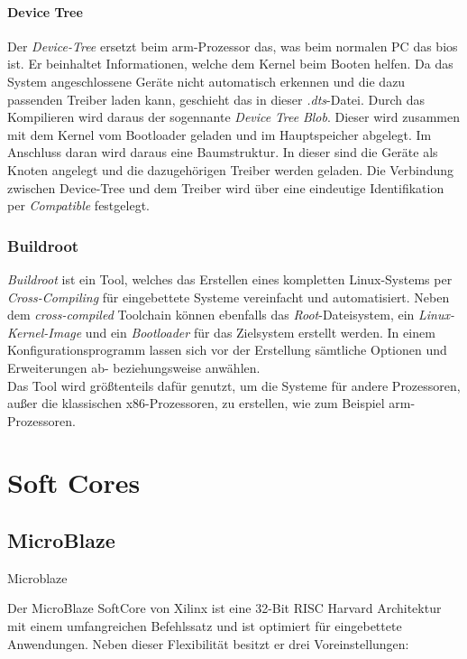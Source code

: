 \subsubsection{Device Tree}\label{kap:devicetree}


Der \emph{Device-Tree} ersetzt beim \ac{arm}-Prozessor das, was beim normalen PC das \ac{bios} ist. Er beinhaltet
Informationen, welche dem Kernel beim Booten helfen. Da das System angeschlossene Geräte nicht automatisch erkennen
und die dazu passenden Treiber laden kann, geschieht das in dieser \emph{.dts}-Datei. Durch das Kompilieren wird daraus
der sogennante \emph{Device} \emph{Tree} \emph{Blob}. Dieser wird zusammen mit dem Kernel vom Bootloader geladen und im
Hauptspeicher abgelegt. Im Anschluss daran wird daraus eine Baumstruktur. In dieser sind die Geräte als Knoten angelegt
und die dazugehörigen Treiber werden geladen. Die Verbindung zwischen Device-Tree und dem Treiber wird über eine
eindeutige Identifikation per \emph{Compatible} festgelegt.


\subsection{Buildroot}\label{kap:buildroot}

\emph{Buildroot} ist ein Tool, welches das Erstellen eines kompletten Linux-Systems per
\emph{Cross-Compiling} für eingebettete Systeme vereinfacht und automatisiert.  Neben dem
\emph{cross-compiled} Toolchain können ebenfalls das \emph{Root}-Dateisystem, ein \emph{Linux-Kernel-Image}
und ein \emph{Bootloader} für das Zielsystem erstellt werden.  In einem Konfigurationsprogramm lassen sich vor der
Erstellung sämtliche Optionen und Erweiterungen ab- beziehungsweise anwählen. \\
Das Tool wird größtenteils dafür genutzt, um die Systeme für andere Prozessoren, außer die klassischen x86-Prozessoren,
zu erstellen, wie zum Beispiel \ac{arm}-Prozessoren.\cite{buildroot}\\

\chapter{Soft Cores}\label{kap:softcores}
\newpage
\section{MicroBlaze}\label{kap:microblaze}
Microblaze

Der MicroBlaze SoftCore von Xilinx ist eine 32-Bit RISC Harvard Architektur mit einem umfangreichen Befehlssatz und ist optimiert für eingebettete Anwendungen.
Neben dieser Flexibilität besitzt er drei Voreinstellungen:

